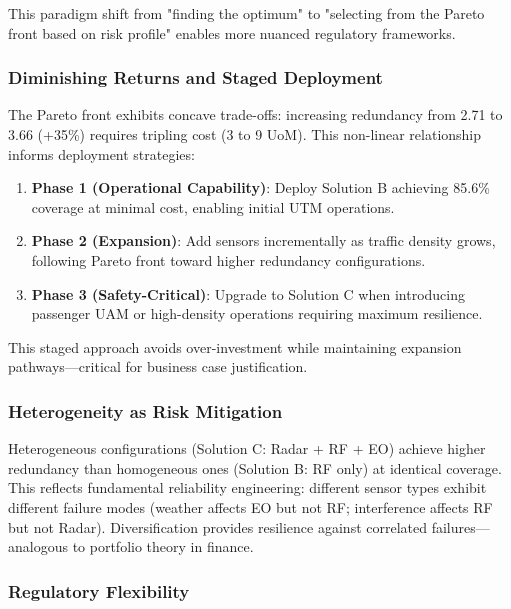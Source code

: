 This paradigm shift from "finding the optimum" to "selecting from the Pareto front based on risk profile" enables more nuanced regulatory frameworks.

\subsubsection{Diminishing Returns and Staged Deployment}

The Pareto front exhibits concave trade-offs: increasing redundancy from 2.71 to 3.66 (+35\%) requires tripling cost (3 to 9 UoM). This non-linear relationship informs deployment strategies:

\begin{enumerate}
\item \textbf{Phase 1 (Operational Capability)}: Deploy Solution B achieving 85.6\% coverage at minimal cost, enabling initial UTM operations.

\item \textbf{Phase 2 (Expansion)}: Add sensors incrementally as traffic density grows, following Pareto front toward higher redundancy configurations.

\item \textbf{Phase 3 (Safety-Critical)}: Upgrade to Solution C when introducing passenger UAM or high-density operations requiring maximum resilience.
\end{enumerate}

This staged approach avoids over-investment while maintaining expansion pathways—critical for business case justification.

\subsubsection{Heterogeneity as Risk Mitigation}

Heterogeneous configurations (Solution C: Radar + RF + EO) achieve higher redundancy than homogeneous ones (Solution B: RF only) at identical coverage. This reflects fundamental reliability engineering: different sensor types exhibit different failure modes (weather affects EO but not RF; interference affects RF but not Radar). Diversification provides resilience against correlated failures—analogous to portfolio theory in finance.

\subsubsection{Regulatory Flexibility}

